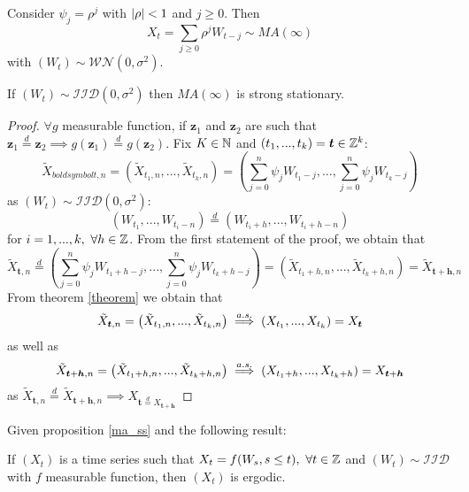 \begin{example}
    Consider $\psi_j=\rho^j$ with $\left|\rho\right|<1$ and $j\ge0$. Then
    \[
        X_t=\sum_{j\ge0}\rho^jW_{t-j}\sim MA(\infty)
    \]
    with $(W_t)\sim\mathcal{WN}(0,\sigma^2)$.
\end{example}

\begin{proposition}
    \label{ma_ss}
    If $(W_t)\sim\mathcal{IID}(0,\sigma^2)$ then $MA(\infty)$ is strong stationary.
\end{proposition}

\begin{proof}
    $\forall g$ measurable function, if $\boldsymbol{z}_1$ and $\boldsymbol{z}_2$ are such that $\boldsymbol{z}_1\stackrel{d}{=}\boldsymbol{z}_2\implies g(\boldsymbol{z}_1)\stackrel{d}{=}g(\boldsymbol{z}_2)$. Fix $K\in\mathbb{N}$ and $(t_1,...,t_k)=\boldsymbol{t}\in\mathbb{Z}^k$:
    \[
        \tilde{X}_{boldsymbol{t},n}=\left(\tilde{X}_{t_1,n},...,\tilde{X}_{t_k,n}\right)=\left(\sum_{j=0}^n\psi_jW_{t_1-j},...,\sum_{j=0}^n\psi_jW_{t_k-j}\right) 
    \]
    as $(W_t)\sim\mathcal{IID}(0,\sigma^2)$:
    \[
        \left(W_{t_1},...,W_{t_i-n}\right)\stackrel{d}{=}\left(W_{t_i+h},...,W_{t_i+h-n}\right)
    \]
    for $i=1,...,k,\ \forall h\in\mathbb{Z}$. From the first statement of the proof, we obtain that
    \[
        \tilde{X}_{\boldsymbol{t},n}\stackrel{d}{=}\left(\sum_{j=0}^n\psi_jW_{t_1+h-j},...,\sum_{j=0}^n\psi_jW_{t_k+h-j}\right)=\left(\tilde{X}_{t_1+h,n},...,\tilde{X}_{t_k+h,n}\right)=\tilde{X}_{\boldsymbol{t}+\boldsymbol{h},n}
    \]
    From theorem \ref{theorem} we obtain that
    \[
        \tilde{X}_{\boldsymbol{t},n}=\left(\tilde{X}_{t_1,n},...,\tilde{X}_{t_k,n}\right)\stackrel{a.s.}{\implies}\left(X_{t_1},...,X_{t_k}\right)=X_{\boldsymbol{t}}
    \]
    as well as
    \[
        \tilde{X}_{\boldsymbol{t}+\boldsymbol{h},n}=\left(\tilde{X}_{t_1+h,n},...,\tilde{X}_{t_k+h,n}\right)\stackrel{a.s.}{\implies}\left(X_{t_1+h},...,X_{t_k+h}\right)=X_{\boldsymbol{t}+\boldsymbol{h}} 
    \]
    as $\tilde{X}_{\boldsymbol{t},n}\stackrel{d}{=}\tilde{X}_{\boldsymbol{t}+\boldsymbol{h},n}\implies X_{\boldsymbol{t}\stackrel{d}{=}X_{\boldsymbol{t}+\boldsymbol{h}}}$
\end{proof}

Given proposition \ref{ma_ss} and the following result:

\begin{theorem}
    If $(X_t)$ is a time series such that $X_t=f(W_s, s\le t),\ \forall t\in\mathbb{Z}$ and $(W_t)\sim\mathcal{IID}$ with $f$ measurable function, then $(X_t)$ is ergodic.
\end{theorem}


